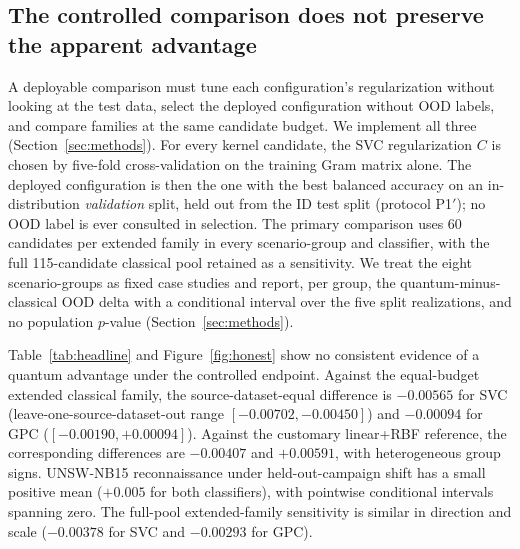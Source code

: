 \documentclass[referee,lineno,pdflatex,sn-nature]{sn-jnl}
\theoremstyle{thmstyleone}%
\theoremstyle{thmstyletwo}%
\theoremstyle{thmstylethree}%
\begin{document}
\subsection{The controlled comparison does not preserve the apparent advantage}
\label{sec:res_honest}

A deployable comparison must tune each configuration's regularization without looking at the test data, select the deployed configuration without OOD labels, and compare families at the same candidate budget. We implement all three (Section~\ref{sec:methods}). For every kernel candidate, the SVC regularization $C$ is chosen by five-fold cross-validation on the training Gram matrix alone. The deployed configuration is then the one with the best balanced accuracy on an in-distribution \emph{validation} split, held out from the ID test split (protocol P1$'$); no OOD label is ever consulted in selection. The primary comparison uses 60 candidates per extended family in every scenario-group and classifier, with the full 115-candidate classical pool retained as a sensitivity. We treat the eight scenario-groups as fixed case studies and report, per group, the quantum-minus-classical OOD delta with a conditional interval over the five split realizations, and no population $p$-value (Section~\ref{sec:methods}).

Table~\ref{tab:headline} and Figure~\ref{fig:honest} show no consistent evidence of a quantum advantage under the controlled endpoint. Against the equal-budget extended classical family, the source-dataset-equal difference is $-0.00565$ for SVC (leave-one-source-dataset-out range $[-0.00702,-0.00450]$) and $-0.00094$ for GPC ($[-0.00190,+0.00094]$). Against the customary linear+RBF reference, the corresponding differences are $-0.00407$ and $+0.00591$, with heterogeneous group signs. UNSW-NB15 reconnaissance under held-out-campaign shift has a small positive mean ($+0.005$ for both classifiers), with pointwise conditional intervals spanning zero. The full-pool extended-family sensitivity is similar in direction and scale ($-0.00378$ for SVC and $-0.00293$ for GPC).
\end{document}
